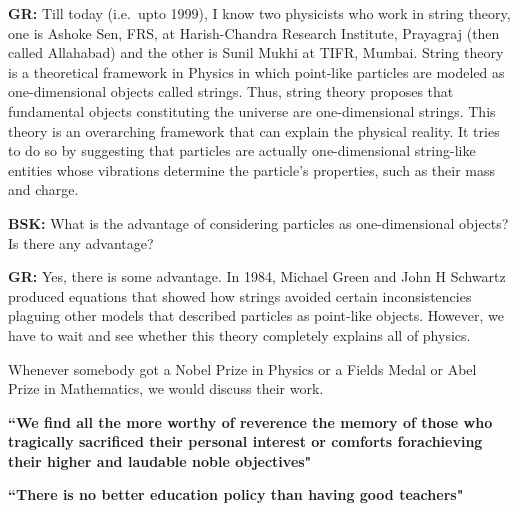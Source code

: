 \textbf{GR:} Till today (i.e.\ upto 1999), I know two physicists who work in string theory, one is Ashoke Sen, FRS, at Harish-Chandra Research Institute, Prayagraj (then called Allahabad) and the other is Sunil Mukhi at TIFR, Mumbai. String theory is a theoretical framework in Physics in which point-like particles are modeled as one-dimensional objects called strings. Thus, string theory proposes that fundamental objects constituting the universe are one-dimensional strings. This theory is an overarching framework that can explain the physical reality. It tries to do so by suggesting that particles are actually one-dimensional string-like entities whose vibrations determine the particle’s properties, such as their mass and charge.

\textbf{BSK:} What is the advantage of considering particles as one-\break dimensional objects? Is there any advantage?

\textbf{GR:} Yes, there is some advantage. In 1984, Michael Green and John H Schwartz produced equations that showed how strings avoided certain inconsistencies plaguing other models that described particles as point-like objects. However, we have to wait and see whether this theory completely explains all of physics.

Whenever somebody got a Nobel Prize in Physics or a Fields Medal or Abel Prize in Mathematics, we would discuss their work.

\textbf{``We find all the more worthy of reverence the memory of those who tragically sacrificed their personal interest or comforts for\break achieving their higher and laudable noble objectives"}

\textbf{``There is no better education policy than having good teachers"}

